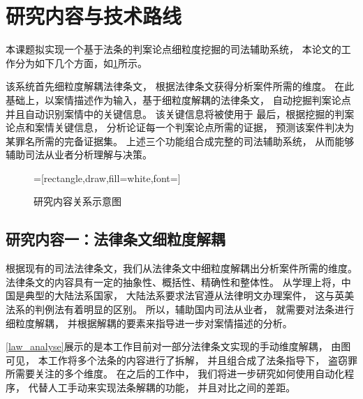\section{研究内容与技术路线}

本课题拟实现一个基于法条的判案论点细粒度挖掘的司法辅助系统，
本论文的工作分为如下几个方面，如\cref{fig_1}所示。

该系统首先细粒度解耦法律条文，
根据法律条文获得分析案件所需的维度。
在此基础上，以案情描述作为输入，基于细粒度解耦的法律条文，
自动挖掘判案论点并且自动识别案情中的关键信息。
该关键信息将被使用于
最后，根据挖掘的判案论点和案情关键信息，
分析论证每一个判案论点所需的证据，
预测该案件判决为某罪名所需的完备证据集。
上述三个功能组合成完整的司法辅助系统，
从而能够辅助司法从业者分析理解与决策。
\begin{figure}[h]
	\centering

	\scriptsize
	=[rectangle,draw,fill=white,font=\fontsize{12pt}{18pt}\selectfont]
	\caption{研究内容关系示意图}
	\label{fig_1}
\end{figure}

\subsection{研究内容一：法律条文细粒度解耦}
根据现有的司法法律条文，我们从法律条文中细粒度解耦出分析案件所需的维度。
法律条文的内容具有一定的抽象性、概括性、精确性和整体性。
从学理上将，中国是典型的大陆法系国家，
大陆法系要求法官遵从法律明文办理案件，
这与英美法系的判例法有着明显的区别。
所以，辅助国内司法从业者，
就需要对法条进行细粒度解耦，
并根据解耦的要素来指导进一步对案情描述的分析。

\cref{law_analyse}展示的是本工作目前对一部分法律条文实现的手动维度解耦，
由图可见，
本工作将多个法条的内容进行了拆解，
并且组合成了法条指导下，
盗窃罪所需要关注的多个维度。
在之后的工作中，
我们将进一步研究如何使用自动化程序，
代替人工手动来实现法条解耦的功能，
并且对比之间的差距。

